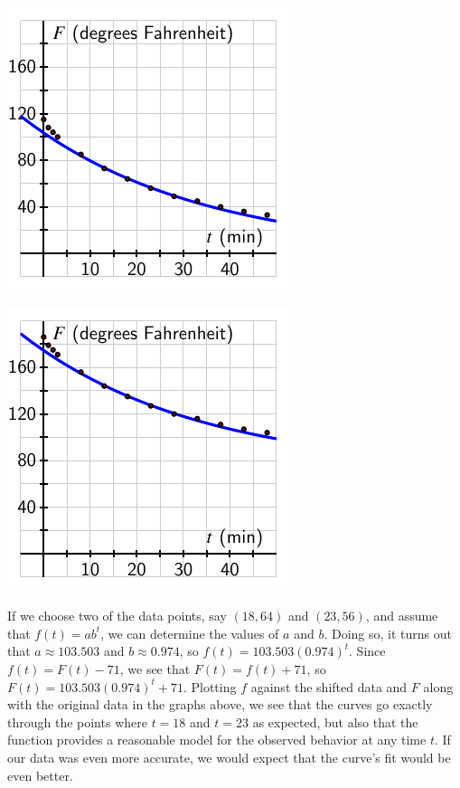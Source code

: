\documentclass[nooutcomes]{ximera}
\begin{document}
\begin{image}
\includegraphics{modeling-coffee-shifted}
\end{image}

\begin{image}
\includegraphics{modeling-coffee-original}
\end{image}

If we choose two of the data points, say $(18,64)$ and $(23,56)$, and assume that $f(t) = ab^t$, we can determine the values of $a$ and $b$.  Doing so, it turns out that $a \approx 103.503$ and $b \approx 0.974$, so $f(t) = 103.503 ( 0.974)^t$.  Since $f(t) = F(t) - 71$, we see that $F(t) = f(t) + 71$, so $F(t) = 103.503 (0.974)^t + 71$.  Plotting $f$ against the shifted data and $F$ along with the original data in the graphs above, we see that the curves go exactly through the points where $t = 18$ and $t = 23$ as expected, but also that the function provides a reasonable model for the observed behavior at any time $t$.  If our data was even more accurate, we would expect that the curve's fit would be even better.
\end{document}
